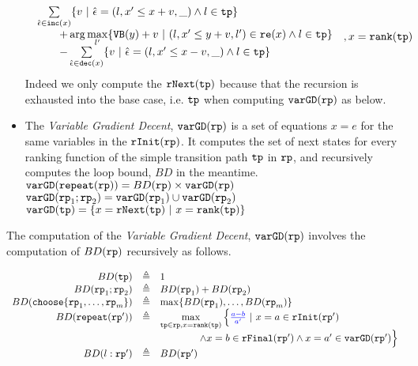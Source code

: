 \begin{defn}
\begin{itemize}
\[\begin{array}{l}
\begin{array}{l}
  \sum\limits_{\absevent \in \inc(x) }
   \left\{ v ~\middle\vert~ \absevent = (l, x' \leq x + v, \_) \land l \in \tpath\right\}
   \\ \qquad 
   + \arg\max\limits_{l' }
      \left\{ \varinvar(y) + v ~\middle\vert~ (l, x' \leq y + v, l') \in \reset(x) \land l \in \tpath\right\}
      \\ \qquad 
     - \sum\limits_{ \absevent \in \dec(x) }\left\{ 
       v ~\middle\vert~ \absevent = (l, x' \leq x - v, \_) \land l \in \tpath 
       \right\}
     \end{array}
   \end{array}
   , x = \locbound(\tpath)
 \]
 Indeed we only compute the $\mathtt{rNext}(\mathtt{tp})$ because that the recursion is exhausted into the base case, i.e. $\mathtt{tp}$ when computing $\mathtt{varGD}(\mathtt{rp})$ as below.
 \item  The \emph{Variable Gradient Decent}, 
 $\mathtt{varGD}(\mathtt{rp})$
 is a set of equations $x = e$ for the same variables in the $\mathtt{rInit}(\mathtt{rp})$.
 It computes the set of next states for every ranking function of the simple transition path $\mathtt{tp}$ in $\mathtt{rp}$,
 and recursively computes the loop bound, $BD$ in the meantime.
 \\
 {$\mathtt{varGD}(\mathtt{repeat}(\mathtt{rp})) =  BD(\mathtt{rp})  \times
{\ensuremath{\mathtt{varGD}}(\ensuremath{\mathtt{rp}})}$}
 \\
 $\mathtt{varGD}(\mathtt{rp}_1;\mathtt{rp}_2) =  \mathtt{varGD}(\mathtt{rp}_1) \cup \mathtt{varGD}(\mathtt{rp}_2)$
 \\
 $\varGD(\tpath) =  \left\{x = \rfnext(\tpath) ~|~ x = \locbound(\tpath) \right\} $  
\end{itemize}
\end{defn}
The computation of the \emph{Variable Gradient Decent}, 
$\mathtt{varGD}(\mathtt{rp})$ involves the computation of $BD(\mathtt{rp})$ recursively as follows.
\begin{defn}
  \label{def:loopbound}
  \[
    \begin{array}{rcl}
      BD(\tpath) & \triangleq & 1 \\
      BD(\rprog_1;\rprog_2) & \triangleq & BD(\rprog_1) + BD(\rprog_2) \\
      BD(\rpchoose{\rprog_1, \ldots, \rprog_m }) & \triangleq 
      & \max\left\{ BD(\rprog_1), \ldots, BD(\rprog_m) \right\} \\
      BD(\rprepeat(\rprog')) & \triangleq 
      &
      \max\limits_{\tpath \in \rprog, x = \locbound(\tpath)}
      \Big\{ \highlight{\frac{a - b}{a'}} ~\vert~
      x = a \in \rfinit(\rprog')
      \\ & & \qquad \qquad
      \land x = b \in \rffinal(\rprog')
      \land x = a' \in \varGD(\rprog')
       \Big\} 
       \\
      BD(l: \rprog') & \triangleq & BD(\rprog')
    \end{array}
    \]
  \end{defn}

